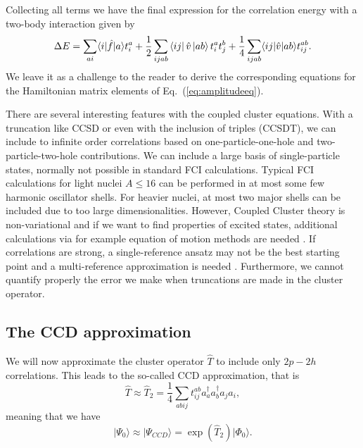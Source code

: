  Collecting all terms we have   the final expression for the correlation energy with a two-body interaction given by
  \begin{equation}\label{eq:energyccsd}
  \Delta E=\sum_{ai}\langle i| \hat{f}|a \rangle t_{i}^{a}+\frac{1}{2} \sum_{ijab} \bra{ij}\hat{v}\ket{ab} t_i^a t_j^b+
  \frac{1}{4}\sum_{ijab}\langle ij | \hat{v}| ab \rangle t_{ij}^{ab}.
  \end{equation}
We leave it as a challenge to the reader to derive the corresponding equations for the Hamiltonian matrix elements of Eq.~(\ref{eq:amplitudeeq}).


  There are several interesting features with the coupled cluster
  equations. With a truncation like CCSD or even with the inclusion of
  triples (CCSDT), we can include to infinite order correlations based
  on one-particle-one-hole and two-particle-two-hole contributions.
  We can include a large basis of single-particle states, normally not
  possible in standard FCI calculations. Typical FCI calculations for
  light nuclei $A\le 16$ can be performed in at most some few harmonic
  oscillator shells. For heavier nuclei, at most two major shells can
  be included due to too large dimensionalities.  However, Coupled
  Cluster theory is non-variational and if we want to find properties
  of excited states, additional calculations via for example equation
  of motion methods are needed \cite{shavittbartlett2009,hagen2014}.
  If correlations are strong, a single-reference ansatz may not be the
  best starting point and a multi-reference approximation is needed
  \cite{jansen2015}. Furthermore, we cannot quantify properly the
  error we make when truncations are made in the cluster operator.

  \subsection{The CCD approximation}

  We will now approximate the cluster operator $\hat{T}$ to include
  only $2p-2h$ correlations. This leads to the so-called CCD
  approximation, that is
  \[
  \hat{T}\approx
  \hat{T}_2=\frac{1}{4}\sum_{abij}t_{ij}^{ab}a^{\dagger}_aa^{\dagger}_ba_ja_i,
  \]
  meaning that we have
  \[
  \vert \Psi_0 \rangle \approx \vert \Psi_{CCD} \rangle =
  \exp{\left(\hat{T}_2\right)}\vert \Phi_0\rangle.
  \]


